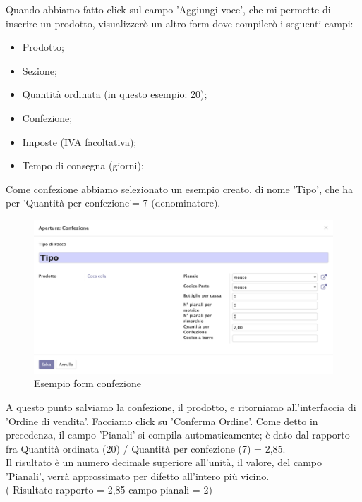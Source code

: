 Quando abbiamo fatto click sul campo 'Aggiungi voce', che mi permette di inserire un prodotto, visualizzerò un altro form dove compilerò i seguenti campi:
\begin{itemize}
\item Prodotto;
\item Sezione;
\item Quantità ordinata (in questo esempio: 20);
\item Confezione;
\item Imposte (IVA facoltativa);
\item Tempo di consegna (giorni);
\end{itemize}

Come confezione abbiamo selezionato un esempio creato, di nome 'Tipo', che ha per 'Quantità per confezione'= 7 (denominatore).
\vspace*{1cm}
\begin{figure}[H]
	\begin{center} \includegraphics[scale=0.3]{figures/package}
		\caption[Esempio form confezione]{Esempio form confezione}
		\label{fig:package}
	\end{center}
\end{figure}

\newpage
A questo punto salviamo la confezione, il prodotto, e ritorniamo all'interfaccia di 'Ordine di vendita'.
Facciamo click su 'Conferma Ordine'. Come detto in precedenza, il campo 'Pianali' si compila automaticamente; è dato dal rapporto fra Quantità ordinata (20) / Quantità per confezione (7) = 2,85.\\
Il risultato è un numero decimale superiore all'unità, il valore, del campo 'Pianali', verrà approssimato per difetto all'intero più vicino.\\
( Risultato rapporto = 2,85 campo pianali = 2)

